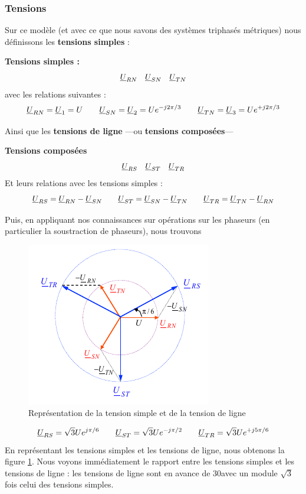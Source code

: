 \documentclass[12pt,a4paper]{article}
\newcommand{\uu}{\uline{U} }
\begin{document}
\subsubsection{Tensions}
Sur ce modèle (et avec ce que nous savons des systèmes triphasés métriques) nous définissons les \textbf{tensions simples} :
\begin{blackbox}
	\textbf{Tensions simples :}
	\[\uu_{RN} \quad \uu_{SN} \quad \uu_{TN}\]
	avec les relations suivantes :
	\begin{equation}
		\uu_{RN} = \uu_1 = U \qquad \uu_{SN} = \uu_2 = Ue^{-j2\pi/3} \qquad \uu_{TN} = \uu_3 = Ue^{+j2\pi/3}
	\end{equation}
\end{blackbox}
Ainsi que les \textbf{tensions de ligne} ---ou \textbf{tensions composées}--- 
\begin{blackbox}
	\textbf{Tensions composées}	
	\[\uu_{RS} \quad \uu_{ST} \quad \uu_{TR}\] 
	Et leurs relations avec les tensions simples :
	\begin{equation}
		\uu_{RS} = \uu_{RN}-\uu_{SN} \qquad \uu_{ST} = \uu_{SN} - \uu_{TN} \qquad \uu_{TR} = \uu_{TN} - \uu_{RN}
	\end{equation}
\end{blackbox}
Puis, en appliquant nos connaissances sur opérations sur les phaseurs (en particulier la soustraction de phaseurs), nous trouvons 
\begin{figure}
	\centering	
	\includegraphics[scale=0.6]{images/phaseur_tension_ligne}
	\caption{Représentation de la tension simple et de la tension de ligne}
	\label{fig: phaseur tension ligne}
\end{figure}
\begin{equation}
	\uu_{RS} = \sqrt{3}Ue^{j\pi/6} \qquad \uu_{ST} = \sqrt{3}Ue^{-j\pi/2} \qquad \uu_{TR} = \sqrt{3}Ue^{+j5\pi/6}
\end{equation}
En représentant les tensions simples et les tensions de ligne, nous obtenons la figure \ref{fig: phaseur tension ligne}. Nous voyons immédiatement le rapport entre les tensions simples et les tensions de ligne : les tensions de ligne sont en avance de 30\degre avec un module $\sqrt{3}$ fois celui des tensions simples.
\end{document}
